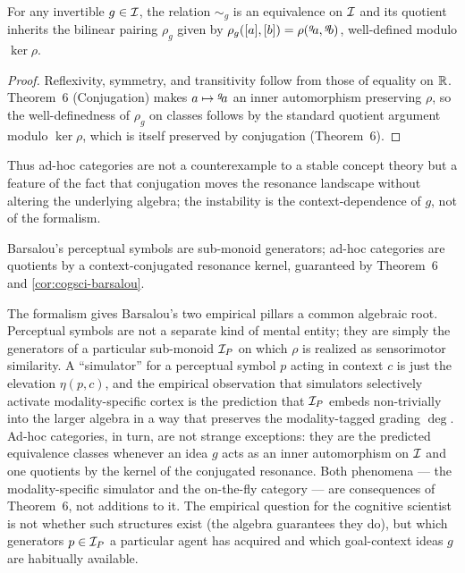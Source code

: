 \begin{corollary}\label{cor:cogsci-barsalou}
For any invertible $g\in\mathcal{I}$, the relation $\sim_g$ is an equivalence
on $\mathcal{I}$ and its quotient inherits the bilinear pairing $\rho_g$ given
by $\rho_g([a],[b])=\rho({}^{g}\!a,{}^{g}\!b)$, well-defined modulo
$\ker\rho$.
\end{corollary}

\begin{proof}
Reflexivity, symmetry, and transitivity follow from those of equality on
$\mathbb{R}$. Theorem~6 (Conjugation) makes $a\mapsto{}^{g}\!a$ an inner
automorphism preserving $\rho$, so the well-definedness of $\rho_g$ on
classes follows by the standard quotient argument modulo $\ker\rho$,
which is itself preserved by conjugation (Theorem~6).
\end{proof}

Thus ad-hoc categories are not a counterexample to a stable concept theory
but a feature of the fact that conjugation moves the resonance landscape
without altering the underlying algebra; the instability is the
context-dependence of $g$, not of the formalism.

\formalstatus Barsalou's perceptual symbols are sub-monoid generators;
ad-hoc categories are quotients by a context-conjugated resonance kernel,
guaranteed by Theorem~6 and \cref{cor:cogsci-barsalou}.

\litcomment The formalism gives Barsalou's two empirical pillars a common
algebraic root. Perceptual symbols are not a separate kind of mental
entity; they are simply the generators of a particular sub-monoid
$\mathcal{I}_P$ on which $\rho$ is realized as sensorimotor similarity. A
``simulator'' for a perceptual symbol $p$ acting in context $c$ is just
the elevation $\eta(p,c)$, and the empirical observation that simulators
selectively activate modality-specific cortex is the prediction that
$\mathcal{I}_P$ embeds non-trivially into the larger algebra in a way that
preserves the modality-tagged grading $\deg$. Ad-hoc categories, in
turn, are not strange exceptions: they are the predicted equivalence
classes whenever an idea $g$ acts as an inner automorphism on $\mathcal{I}$
and one quotients by the kernel of the conjugated resonance. Both
phenomena --- the modality-specific simulator and the on-the-fly
category --- are consequences of Theorem~6, not additions to it. The
empirical question for the cognitive scientist is not whether such
structures exist (the algebra guarantees they do), but which generators
$p\in\mathcal{I}_P$ a particular agent has acquired and which goal-context
ideas $g$ are habitually available.

